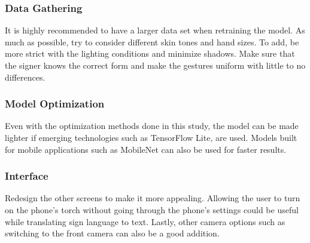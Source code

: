 \documentclass[journal]{./IEEE/IEEEtran}
\begin{document}
\subsubsection{Data Gathering}
It is highly recommended to have a larger data set when retraining the model. As much as possible, try to consider different skin tones and hand sizes. To add, be more strict with the lighting conditions and minimize shadows. Make sure that the signer knows the correct form and make the gestures uniform with little to no differences.
\newline
\subsubsection{Model Optimization}
Even with the optimization methods done in this study, the model can be made lighter if emerging technologies such as TensorFlow Lite, are used. Models built for mobile applications such as MobileNet can also be used for faster results.
\newline
\subsubsection{Interface}
Redesign the other screens to make it more appealing. Allowing the user to turn on the phone's torch without going through the phone's settings could be useful while translating sign language to text. Lastly, other camera options such as switching to the front camera can also be a good addition.



\end{document}
